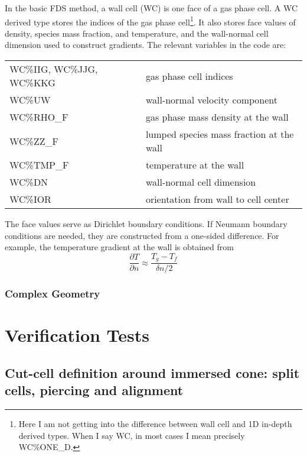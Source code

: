 \documentclass[12pt]{article}
\begin{document}
In the basic FDS method, a wall cell (WC) is one face of a gas phase cell.  A WC derived type stores the indices of the gas phase cell\footnote{Here I am not getting into the difference between wall cell and 1D in-depth derived types.  When I say WC, in most cases I mean precisely {\ct WC\%ONE\_D}.}.  It also stores face values of density, species mass fraction, and temperature, and the wall-normal cell dimension used to construct gradients.  The relevant variables in the code are:

\begin{table}[h!]
\begin{tabular}{ll}
{\ct WC\%IIG, WC\%JJG, WC\%KKG} & gas phase cell indices \\
{\ct WC\%UW}                    & wall-normal velocity component \\
{\ct WC\%RHO\_F}                & gas phase mass density at the wall \\
{\ct WC\%ZZ\_F}                 & lumped species mass fraction at the wall \\
{\ct WC\%TMP\_F}                & temperature at the wall \\
{\ct WC\%DN}                    & wall-normal cell dimension \\
{\ct WC\%IOR}                   & orientation from wall to cell center
\end{tabular}
\end{table}

The face values serve as Dirichlet boundary conditions.  If Neumann boundary conditions are needed, they are constructed from a one-sided difference.  For example, the temperature gradient at the wall is obtained from
\begin{equation}
\frac{\partial T}{\partial n} \approx \frac{T_g - T_f}{\delta n/2}
\end{equation}

\subsubsection{Complex Geometry}






\section{Verification Tests}


\subsection{Cut-cell definition around immersed cone: split cells, piercing and alignment}
\end{document}
